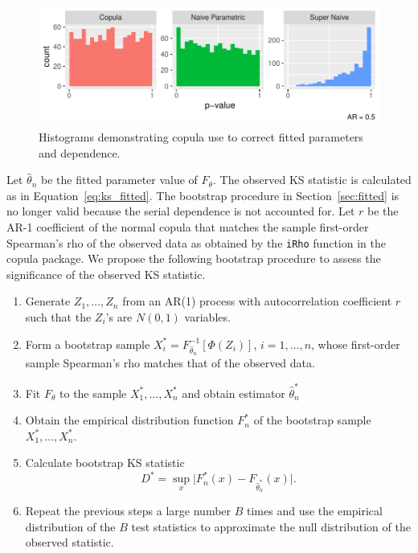 \documentclass[12pt, letterpaper, titlepage]{article}
\begin{document}
\begin{figure}[tbp]
  \centering
  \includegraphics{hist_copula}
  \caption{Histograms demonstrating copula use to correct fitted parameters and dependence.}
  \label{fig:hist_copula}
\end{figure}

Let $\hat\theta_n$ be the fitted parameter value of $F_{\theta}$. The observed
KS statistic is calculated as in Equation~\eqref{eq:ks_fitted}. The bootstrap
procedure in Section~\ref{sec:fitted} is no longer valid because the serial
dependence is not accounted for. Let $r$ be the
AR-1 coefficient of the normal copula that matches the sample first-order
Spearman's rho of the observed data as obtained by the \texttt{iRho} function in
the \textsf{copula} package. We propose the following bootstrap procedure to
assess the significance of the observed KS statistic.
\begin{enumerate}
\item
  Generate $Z_1, \ldots, Z_n$ from an AR(1) process with autocorrelation
  coefficient $r$ such that the $Z_i$'s are $N(0, 1)$ variables.
\item
  Form a bootstrap sample $X_i^* = F^{-1}_{\hat\theta_n} [\Phi(Z_i)]$,
  $i = 1, \ldots, n$, whose first-order sample Spearman's rho matches that of
  the observed data.
\item
  Fit $F_\theta$ to the sample $X_1^*, \ldots, X_n^*$ and obtain estimator $\hat\theta_n^*$
\item
  Obtain the empirical distribution function $F_n^*$ of the bootstrap sample
  $X_1^*, \ldots, X_n^*$.
\item 
  Calculate bootstrap KS statistic
  \[
    D^* = \sup_x \lvert F_n^* (x)- F_{\hat\theta_n^*}(x) \rvert.
  \]
\item
  Repeat the previous steps a large number $B$ times and use the empirical
    distribution of the $B$ test statistics to approximate
    the null distribution of the observed statistic.      
\end{enumerate}
\end{document}
